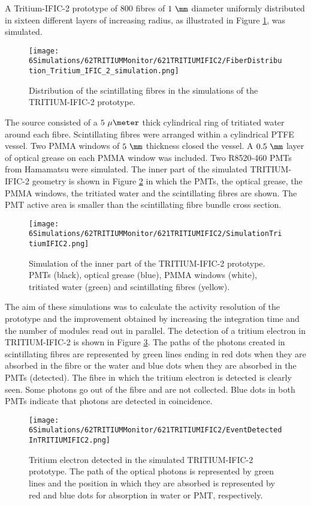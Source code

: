 A Tritium-IFIC-2 prototype of $800$ fibres of $1~\mm$ diameter uniformly distributed in sixteen different layers of increasing radius, as illustrated in Figure \ref{fig:FibersTritiumIFIC2Simulation}, was simulated.
\begin{figure}[h]
\centering
\texttt{[image: 6Simulations/62TRITIUMMonitor/621TRITIUMIFIC2/FiberDistribution\_Tritium\_IFIC\_2\_simulation.png]}
\caption{Distribution of the scintillating fibres in the simulations of the TRITIUM-IFIC-2 prototype.\label{fig:FibersTritiumIFIC2Simulation}}
\end{figure}
The source consisted of a $5~\mu\meter$ thick cylindrical ring of tritiated water around each fibre. Scintillating fibres were arranged within a cylindrical PTFE vessel. Two PMMA windows of $5~\mm$ thickness closed the vessel. A $0.5~\mm$ layer of optical grease on each PMMA window was included. Two R8520-460 PMTs from Hamamatsu \cite{DataSheetPMTs} were simulated. The inner part of the simulated TRITIUM-IFIC-2 geometry is shown in Figure \ref{fig:TritiumIFIC2Simulation} in which the PMTs, the optical grease, the PMMA windows, the tritiated water and the scintillating fibres are shown. The PMT active area is smaller than the scintillating fibre bundle cross section.
\begin{figure}[h]
\centering
\texttt{[image: 6Simulations/62TRITIUMMonitor/621TRITIUMIFIC2/SimulationTritiumIFIC2.png]}
\caption{Simulation of the inner part of the TRITIUM-IFIC-2 prototype. PMTs (black), optical grease (blue), PMMA windows (white), tritiated water (green) and scintillating fibres (yellow). \label{fig:TritiumIFIC2Simulation}}
\end{figure}
The aim of these simulations was to calculate the activity resolution of the prototype and the improvement obtained by increasing the integration time and the number of modules read out in parallel. The detection of a tritium electron in TRITIUM-IFIC-2 is shown in Figure \ref{fig:TritiumEventDetectedInSimulatedPrototype}. The paths of the photons created in scintillating fibres are represented by green lines ending in red dots when they are absorbed in the fibre or the water and blue dots when they are absorbed in the PMTs (detected). The fibre in which the tritium electron is detected is clearly seen. Some photons go out of the fibre and are not collected. Blue dots in both PMTs indicate that photons are detected in coincidence.
\begin{figure}[hbtp]
\centering
\texttt{[image: 6Simulations/62TRITIUMMonitor/621TRITIUMIFIC2/EventDetectedInTRITIUMIFIC2.png]}
\caption{Tritium electron detected in the simulated TRITIUM-IFIC-2 prototype. The path of the optical photons is represented by green lines and the position in which they are absorbed is represented by red and blue dots for absorption in water or PMT, respectively.\label{fig:TritiumEventDetectedInSimulatedPrototype}}
\end{figure}
